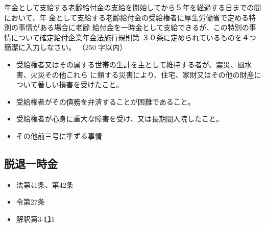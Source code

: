 \begin{shortanswer}[年金1 2024 問題2(1)イ]
  年金として支給する老齢給付金の支給を開始してから５年を経過する日までの間において、年
金として支給する老齢給付金の受給権者に厚生労働省で定める特別の事情がある場合に老齢
給付金を一時金として支給できるが、この特別の事情について確定給付企業年金法施行規則第
３０条に定められているものを４つ簡潔に入力しなさい。 （250 字以内）
\end{shortanswer}

\begin{answerbox}
  \begin{itemize}
    \item 受給権者又はその属する世帯の生計を主として維持する者が、震災、風水害、火災その他これら
に類する災害により、住宅、家財又はその他の財産について著しい損害を受けたこと。
\item 受給権者がその債務を弁済することが困難であること。
\item 受給権者が心身に重大な障害を受け、又は長期間入院したこと。
\item その他前三号に準ずる事情
  \end{itemize}
\end{answerbox}

\newpage

\subsection{脱退一時金}

\begin{InyouJobunbox}
  \begin{itemize}
    \item 法第41条、第42条
    \item 令第27条
    \item 解釈第3-1\textcircled{11}
  \end{itemize}
\end{InyouJobunbox}

